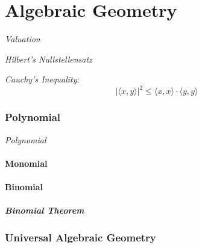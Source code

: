 \part{Algebraic Geometry}\label{sec:algebraic_geometry}

\emph{Valuation}

\emph{Hilbert's Nullstellensatz}

\emph{Cauchy's Inequality}:
\[
    |\langle x,y \rangle|^2 \leq \langle x,x \rangle \cdot \langle
    y,y \rangle
\]



\section{Polynomial}\label{sec:polynomial}

\emph{Polynomial}



\subsection{Monomial}\label{sec:monomial}

\subsection{Binomial}\label{sec:binomial}

\subsubsection{Binomial Theorem}\label{sec:binomial_theorem}



\section{Universal Algebraic Geometry}\label{sec:universal_geometry}



